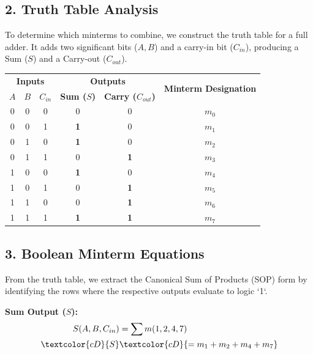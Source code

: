 \documentclass[12pt,a3paper]{article}
\begin{document}
\begin{enumerate}
\begin{tcolorbox}[enhanced,breakable,ansbox,colback=cD!4,colframe=cD,boxrule=0.8pt,arc=5pt,title={\textbf{Answer}},fonttitle=\bfseries\color{white},colbacktitle=cD]
\subsection*{2. Truth Table Analysis}

To determine which minterms to combine, we construct the truth table for a full adder. It adds two significant bits ($A, B$) and a carry-in bit ($C_{in}$), producing a Sum ($S$) and a Carry-out ($C_{out}$).

\begin{center}
\renewcommand{\arraystretch}{1.25}
\begin{tabular}{ccc|cc|c}
\toprule
\multicolumn{3}{c|}{\textbf{Inputs}} & \multicolumn{2}{c|}{\textbf{Outputs}} & \multirow{2}{*}{\textbf{Minterm Designation}} \\
$A$ & $B$ & $C_{in}$ & \textbf{Sum ($S$)} & \textbf{Carry ($C_{out}$)} & \\
\midrule
0 & 0 & 0 & 0 & 0 & $m_0$ \\
0 & 0 & 1 & \textcolor{cD}{\textbf{1}} & 0 & \textcolor{cD}{\textbf{$m_1$}} \\
0 & 1 & 0 & \textcolor{cD}{\textbf{1}} & 0 & \textcolor{cD}{\textbf{$m_2$}} \\
0 & 1 & 1 & 0 & \textcolor{cD}{\textbf{1}} & \textcolor{cD}{\textbf{$m_3$}} \\
1 & 0 & 0 & \textcolor{cD}{\textbf{1}} & 0 & \textcolor{cD}{\textbf{$m_4$}} \\
1 & 0 & 1 & 0 & \textcolor{cD}{\textbf{1}} & \textcolor{cD}{\textbf{$m_5$}} \\
1 & 1 & 0 & 0 & \textcolor{cD}{\textbf{1}} & \textcolor{cD}{\textbf{$m_6$}} \\
1 & 1 & 1 & \textcolor{cD}{\textbf{1}} & \textcolor{cD}{\textbf{1}} & \textcolor{cD}{\textbf{$m_7$}} \\
\bottomrule
\end{tabular}
\end{center}

\subsection*{3. Boolean Minterm Equations}

From the truth table, we extract the Canonical Sum of Products (SOP) form by identifying the rows where the respective outputs evaluate to logic `1`.

\textbf{Sum Output ($S$):}
\begin{align*}
    S(A, B, C_{in}) &= \sum m(1, 2, 4, 7) \\
    \textcolor{cD}{S} &\textcolor{cD}{= m_1 + m_2 + m_4 + m_7}
\end{align*}


\end{tcolorbox}
\end{enumerate}
\end{document}
